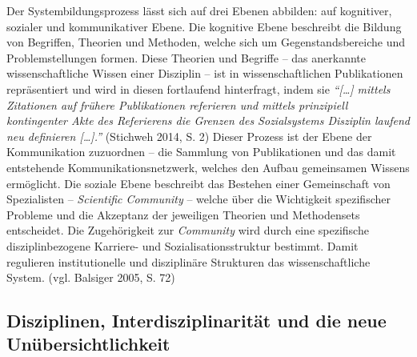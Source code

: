 \documentclass[a4paper,
fontsize=11pt,
oneside,
numbers=noperiodatend,
parskip=half-,
bibliography=totoc,
final
]{scrartcl}
\begin{document}
Der Systembildungsprozess lässt sich auf drei Ebenen abbilden: auf
kognitiver, sozialer und kommunikativer Ebene. Die kognitive Ebene
beschreibt die Bildung von Begriffen, Theorien und Methoden, welche sich
um Gegenstandsbereiche und Problemstellungen formen. Diese Theorien und
Begriffe -- das anerkannte wissenschaftliche Wissen einer Disziplin --
ist in wissenschaftlichen Publikationen repräsentiert und wird in diesen
fortlaufend hinterfragt, indem sie \emph{\enquote{{[}\ldots{}{]} mittels
Zitationen auf frühere Publikationen referieren und mittels prinzipiell
kontingenter Akte des Referierens die Grenzen des Sozialsystems
Disziplin laufend neu definieren {[}\ldots{}{]}.}} (Stichweh 2014, S. 2)
Dieser Prozess ist der Ebene der Kommunikation zuzuordnen -- die
Sammlung von Publikationen und das damit entstehende
Kommunikationsnetzwerk, welches den Aufbau gemeinsamen Wissens
ermöglicht. Die soziale Ebene beschreibt das Bestehen einer Gemeinschaft
von Spezialisten -- \emph{Scientific Community} -- welche über die
Wichtigkeit spezifischer Probleme und die Akzeptanz der jeweiligen
Theorien und Methodensets entscheidet. Die Zugehörigkeit zur
\emph{Community} wird durch eine spezifische disziplinbezogene Karriere-
und Sozialisationsstruktur bestimmt. Damit regulieren institutionelle
und disziplinäre Strukturen das wissenschaftliche System. (vgl. Balsiger
2005, S. 72)

\subsection*{Disziplinen, Interdisziplinarität und die neue
Unübersichtlichkeit}\label{disziplinen-interdisziplinarituxe4t-und-die-neue-unuxfcbersichtlichkeit}
\end{document}
